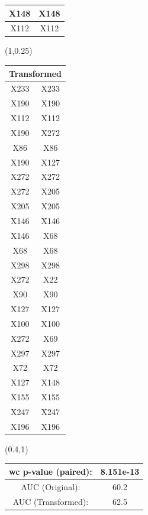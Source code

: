 \documentclass{beamer}
\newcommand{\boz}{\cellcolor{pathwaynode}}
\begin{document}
\begin{frame}
\begin{textblock*}{\paperwidth}
\begin{tabular}{| c c |}
\boz X148   &  \boz X148  \\ \hline
X112   &  X112  \\ \hline
    \end{tabular}
    \hspace{.5em}
  \end{textblock*}
  \begin{textblock*}{\paperwidth}(1\textwidth,0.25\textheight)
    \raggedright 
    \tiny
    \begin{tabular}{| c c |}
      \hline
\toprule
\multicolumn{2}{c}{Transformed} \\ 
\midrule \hline
X233   &  X233  \\ \hline
\boz X190   &  \boz X190  \\ \hline
X112   &  X112  \\ \hline
\boz X190   &  \boz X272  \\ \hline
X86   &  X86  \\ \hline
\boz X190   &  X127  \\ \hline
\boz X272   &  \boz X272  \\ \hline
\boz X272   &  X205  \\ \hline
X205   &  X205  \\ \hline
X146   &  X146  \\ \hline
X146   &  X68  \\ \hline
X68   &  X68  \\ \hline
X298   &  X298  \\ \hline
\boz X272   &  \boz X22  \\ \hline
X90   &  X90  \\ \hline
X127   &  X127  \\ \hline
X100   &  X100  \\ \hline
\boz X272   &  X69  \\ \hline
X297   &  X297  \\ \hline
X72   &  X72  \\ \hline
X127   &  \boz X148  \\ \hline
X155   &  X155  \\ \hline
X247   &  X247  \\ \hline
X196   &  X196  \\ \hline
    \end{tabular}
    \hspace{.5em}
  \end{textblock*}
  \begin{textblock*}{\paperwidth}(0.4\textwidth,1\textheight)
    \raggedright 
    \tiny
    \begin{tabular}{| c c |}
      \hline
      wc p-value (paired): & 8.151e-13 \\ \hline
AUC (Original): & 60.2 \\ \hline
AUC (Transformed): & 62.5 \\ \hline
    \end{tabular}
    \hspace{.5em}
  \end{textblock*}
\end{frame}
\end{document}

